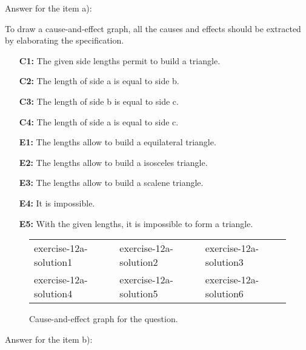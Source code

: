 \begin{exercise}
    Answer for the item a):
    
    To draw a cause-and-effect graph, all the causes and effects should be extracted by elaborating the specification.
    
    \begin{enumerate}
        \item[\textbf{C1:}] The given side lengths permit to build a triangle.
        \item[\textbf{C2:}] The length of side a is equal to side b.
        \item[\textbf{C3:}] The length of side b is equal to side c.
        \item[\textbf{C4:}] The length of side a is equal to side c.
        \item[\textbf{E1:}] The lengths allow to build a equilateral triangle.
        \item[\textbf{E2:}] The lengths allow to build a isosceles triangle.
        \item[\textbf{E3:}] The lengths allow to build a scalene triangle.
        \item[\textbf{E4:}] It is impossible.
        \item[\textbf{E5:}] With the given lengths, it is impossible to form a triangle.
    \end{enumerate}
    
    \begin{figure}[H]
        \centering
        \begin{tabular}{iii}
            exercise-12a-solution1 & exercise-12a-solution2 & exercise-12a-solution3\\
            exercise-12a-solution4 & exercise-12a-solution5 & exercise-12a-solution6
        \end{tabular}
        \caption{Cause-and-effect graph for the question.}
        \label{fig:cne-graphs}
    \end{figure}
    
    Answer for the item b):
    

\end{exercise}
